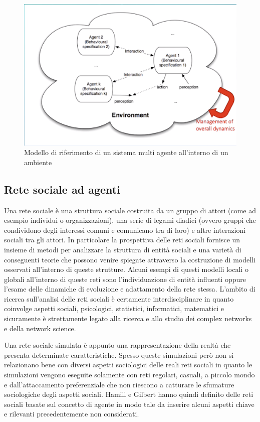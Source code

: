 \begin{figure}[H]
    \centering
    \includegraphics[width=.6\textwidth]{resources/agente_modello_riferimento.png}
    \caption{Modello di riferimento di un sistema multi agente all'interno di un ambiente} 
\end{figure}

\subsection{Rete sociale ad agenti}

Una rete sociale \cite{SocialNetworkAnalysis} è una struttura sociale costruita da un gruppo di attori (come ad esempio individui o organizzazioni), una serie di legami diadici (ovvero gruppi che condividono degli interessi comuni e comunicano tra di loro) e altre interazioni sociali tra gli attori. In particolare la prospettiva delle reti sociali fornisce un insieme di metodi per analizzare la struttura di entità sociali e una varietà di conseguenti teorie che possono venire spiegate attraverso la costruzione di modelli osservati all'interno di queste strutture.
Alcuni esempi di questi modelli locali o globali all'interno di queste reti sono l'individuazione di entità influenti oppure l'esame delle dinamiche di evoluzione e adattamento della rete stessa.
L'ambito di ricerca sull'analisi delle reti sociali è certamente interdisciplinare in quanto coinvolge aspetti sociali, psicologici, statistici, informatici, matematici e sicuramente è strettamente legato alla ricerca e allo studio dei complex networks e della network science.

Una rete sociale simulata è appunto una rappresentazione della realtà che presenta determinate caratteristiche. Spesso queste simulazioni però non si relazionano bene con diversi aspetti sociologici delle reali reti sociali in quanto le simulazioni vengono eseguite solamente con reti regolari, casuali, a piccolo mondo e dall'attaccamento preferenziale che non riescono a catturare le sfumature sociologiche degli aspetti sociali. Hamill e Gilbert \cite{SimulatingLargeSocialNetworks} hanno quindi definito delle reti sociali basate sul concetto di agente in modo tale da inserire alcuni aspetti chiave e rilevanti precedentemente non considerati.

